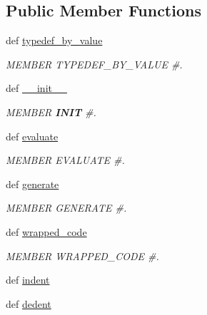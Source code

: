 \subsection*{Public Member Functions}
\begin{DoxyCompactItemize}
\item 
def \hyperlink{classscipy_1_1weave_1_1bytecodecompiler_1_1CXXCoder_af442b9b47d4a88042ae2354bc6c90efb}{typedef\+\_\+by\+\_\+value}
\begin{DoxyCompactList}\small\item\em M\+E\+M\+B\+E\+R T\+Y\+P\+E\+D\+E\+F\+\_\+\+B\+Y\+\_\+\+V\+A\+L\+U\+E \#. \end{DoxyCompactList}\item 
def \hyperlink{classscipy_1_1weave_1_1bytecodecompiler_1_1CXXCoder_af96e7466a2bcb5cac7604a694123b7e1}{\+\_\+\+\_\+init\+\_\+\+\_\+}
\begin{DoxyCompactList}\small\item\em M\+E\+M\+B\+E\+R {\bfseries I\+N\+I\+T} \#. \end{DoxyCompactList}\item 
def \hyperlink{classscipy_1_1weave_1_1bytecodecompiler_1_1CXXCoder_a7810ed593f0f9f1dfc3184c753517c7e}{evaluate}
\begin{DoxyCompactList}\small\item\em M\+E\+M\+B\+E\+R E\+V\+A\+L\+U\+A\+T\+E \#. \end{DoxyCompactList}\item 
def \hyperlink{classscipy_1_1weave_1_1bytecodecompiler_1_1CXXCoder_a0abc3628af6cc8a7a67a47fb40e135a1}{generate}
\begin{DoxyCompactList}\small\item\em M\+E\+M\+B\+E\+R G\+E\+N\+E\+R\+A\+T\+E \#. \end{DoxyCompactList}\item 
def \hyperlink{classscipy_1_1weave_1_1bytecodecompiler_1_1CXXCoder_a99c44d5dec56fb912b2b776456eb5429}{wrapped\+\_\+code}
\begin{DoxyCompactList}\small\item\em M\+E\+M\+B\+E\+R W\+R\+A\+P\+P\+E\+D\+\_\+\+C\+O\+D\+E \#. \end{DoxyCompactList}\item 
def \hyperlink{classscipy_1_1weave_1_1bytecodecompiler_1_1CXXCoder_a46ea7fb2e402def59180330ccb5e13c8}{indent}
\item 
def \hyperlink{classscipy_1_1weave_1_1bytecodecompiler_1_1CXXCoder_afa106f8eba9d6d85e9463887ca2e0458}{dedent}
\item 

\end{DoxyCompactItemize}
